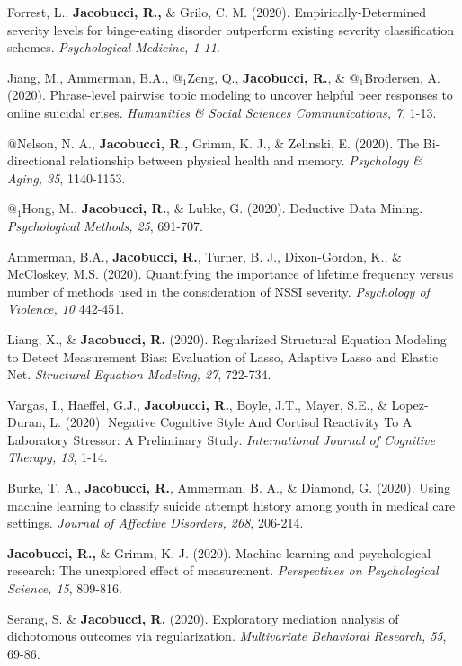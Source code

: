 \documentclass[letterpaper,10pt]{article}
\begin{document}
\begin{etaremune}
		\item Forrest, L., \textbf{Jacobucci, R.,} \& Grilo, C. M. (2020). Empirically-Determined severity levels for binge-eating disorder outperform existing severity classification schemes. \emph{Psychological Medicine, 1-11}.
		\item Jiang, M., Ammerman, B.A., $@_1$Zeng, Q., \textbf{Jacobucci, R.}, \& $@_1$Brodersen, A. (2020). Phrase-level pairwise topic modeling to uncover helpful peer responses to online suicidal crises. \emph{Humanities \& Social Sciences Communications, 7}, 1-13.
	\item $@$Nelson, N. A., \textbf{Jacobucci, R.,} Grimm, K. J., \& Zelinski, E. (2020). The Bi-directional relationship between physical health and memory. \emph{Psychology \& Aging, 35}, 1140-1153.
	\item  $@_1$Hong, M., \textbf{Jacobucci, R.}, \& Lubke, G. (2020). Deductive Data Mining. \emph{Psychological Methods, 25}, 691-707.
	\item  Ammerman, B.A., \textbf{Jacobucci, R.}, Turner, B. J., Dixon-Gordon, K., \& McCloskey, M.S. (2020). Quantifying the importance of lifetime frequency versus number of methods used in the consideration of NSSI severity. \emph{Psychology of Violence, 10} 442-451.
	\item Liang, X., \& \textbf{Jacobucci, R.} (2020). Regularized Structural Equation Modeling to Detect Measurement Bias: Evaluation of Lasso, Adaptive Lasso and Elastic Net. \emph{Structural Equation Modeling, 27}, 722-734.
	\item Vargas, I., Haeffel, G.J., \textbf{Jacobucci, R.}, Boyle, J.T., Mayer, S.E., \& Lopez-Duran, L. (2020). Negative Cognitive Style And Cortisol Reactivity To A Laboratory Stressor: A Preliminary Study. \emph{International Journal of Cognitive Therapy, 13}, 1-14. 
	\item Burke, T. A., \textbf{Jacobucci, R.}, Ammerman, B. A., \& Diamond, G. (2020). Using machine learning to classify suicide attempt history among youth in medical care settings. \emph{Journal of Affective Disorders, 268}, 206-214.
	\item  \textbf{Jacobucci, R.,} \& Grimm, K. J. (2020). Machine learning and psychological research: The unexplored effect of measurement. \emph{Perspectives on Psychological Science, 15}, 809-816.
	\item Serang, S. \& \textbf{Jacobucci, R.} (2020). Exploratory mediation analysis of dichotomous outcomes via regularization. \emph{Multivariate Behavioral Research, 55}, 69-86.

\end{etaremune}
\end{document}
